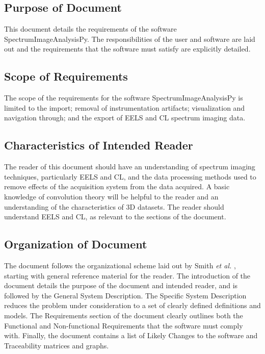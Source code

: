 \documentclass[12pt]{article}
\newcommand{\progname}{SpectrumImageAnalysisPy} %
\begin{document}
\subsection{Purpose of Document}

This document details the requirements of the software \progname{}. The
responsibilities of the user and software are laid out and the requirements that
the software must satisfy are explicitly detailed.

\subsection{Scope of Requirements} 
The scope of the requirements for the software \progname{} is limited to the
import; removal of instrumentation artifacts; visualization and navigation
through; and the export of EELS and CL spectrum imaging data.

\subsection{Characteristics of Intended Reader} 
The reader of this document should have an understanding of spectrum imaging
techniques, particularly EELS and CL, and the data processing methods used to
remove effects of the acquisition system from the data acquired. A basic
knowledge of convolution theory will be helpful to the reader and an
understanding of the characteristics of 3D datasets. The reader should
understand EELS and CL, as relevant to the sections of the document.

\subsection{Organization of Document}

The document follows the organizational scheme laid out by Smith \textit{et al.}
\cite{SmithAndLai2005, smith_requirements_2007}, starting with general reference
material for the reader. The introduction of the document details the purpose of
the document and intended reader, and is followed by the General System
Description. The Specific System Description reduces the problem under
consideration to a set of clearly defined definitions and models. The
Requirements section of the document clearly outlines both the Functional and
Non-functional Requirements that the software must comply with. Finally, the
document contains a list of Likely Changes to the software and Traceability
matrices and graphs.
\end{document}
